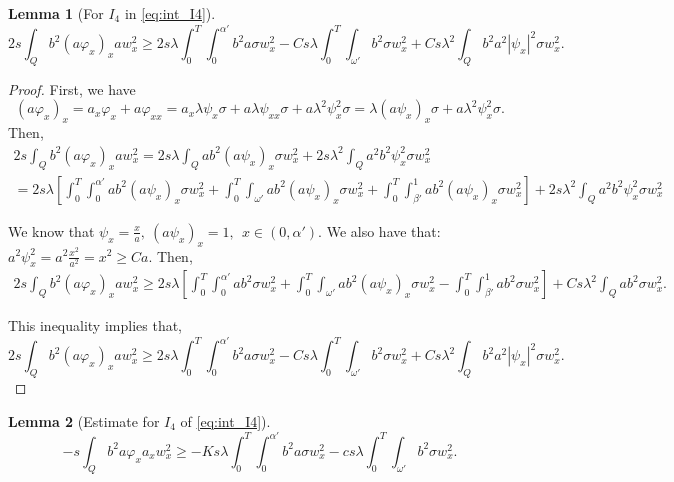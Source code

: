 \documentclass[11pt,oneside,a4papper]{osajnl}
\newtheorem{lema}{Lemma}
\begin{document}
\begin{lema}[For $I_4$ in \eqref{eq:int_I4}]\label{lemaA6}
	\begin{equation*}
		2s \int_Q b^2 (a \varphi_x)_x a w_x^2 \geq
		2 s \lambda \int_0^T \int_0^{\alpha'} b^2 a \sigma w_x^2 - C s\lambda \int_0^T\int_{\omega'} b^2 \sigma w_x^2 + C s \lambda^2 \int_Q b^2 a^2 |\psi_x|^2 \sigma w_x^2.
	\end{equation*}
\end{lema}
\begin{proof}
    First, we have
    $$(a \varphi_x)_x=a_x \varphi_x+a\varphi_{xx} = a_x \lambda \psi_x\sigma+a\lambda \psi_{xx}\sigma+a\lambda^2\psi_x^2\sigma=\lambda(a\psi_x)_x\sigma +a\lambda^2\psi_x^2\sigma.$$
    Then,
    \begin{multline*}
        2s \int_Q b^2 (a \varphi_x)_x a w_x^2 =2s\lambda  \int_Q ab^2 (a \psi_x)_x \sigma w_x^2+2s\lambda^2\int_Q a^2b^2  \psi_x^2 \sigma w_x^2	\\
        =2s\lambda\left[\int_0^T \int_0^{\alpha'} ab^2 (a \psi_x)_x \sigma w_x^2 +  \int_0^T\int_{\omega'} ab^2 (a \psi_x)_x \sigma w_x^2 %
        + \int_0^T \int_{\beta'}^1 ab^2 (a \psi_x)_x \sigma w_x^2\right] + 2s\lambda^2\int_Q a^2b^2  \psi_x^2 \sigma w_x^2
    \end{multline*}
	
    We know that 
    $\psi_x=\frac{x}{a}, \  (a\psi_x)_x=1, \ \ x\in(0,\alpha')$. We also have that:  $a^2\psi_x^2=a^2\frac{x^2}{a^2}=x^2\geq Ca$. Then,
    \begin{multline*}
        2s \int_Q b^2 (a \varphi_x)_x a w_x^2\geq 2s\lambda\left[\int_0^T \int_0^{\alpha'} ab^2 \sigma w_x^2 +  \int_0^T\int_{\omega'} ab^2 (a \psi_x)_x \sigma w_x^2 - \int_0^T \int_{\beta'}^1 ab^2 \sigma w_x^2\right]	%
		+ Cs\lambda^2\int_Q ab^2 \sigma w_x^2.
    \end{multline*}
    
    This inequality implies that,
    $$ 2s \int_Q b^2 (a \varphi_x)_x a w_x^2 \geq 2 s \lambda \int_0^T \int_0^{\alpha'} b^2 a \sigma w_x^2 - C s\lambda \int_0^T\int_{\omega'} b^2 \sigma w_x^2 + C s \lambda^2 \int_Q b^2 a^2 |\psi_x|^2 \sigma w_x^2.$$	
\end{proof}


\begin{lema}[Estimate for $I_4$ of \eqref{eq:int_I4}] \label{lemaA7}
	\begin{equation*}
		-s \int_Q b^2 a \varphi_x a_x w_x^2 \geq
		- K s \lambda \int_0^T \int_0^{\alpha'} b^2 a \sigma w_x^2 - c s \lambda \int_0^T\int_{\omega'} b^2 \sigma w_x^2.
	\end{equation*}
\end{lema}	
\end{document}

